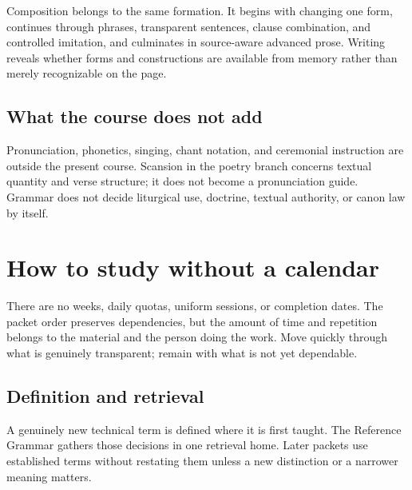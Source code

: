 Composition belongs to the same formation. It begins with changing one form,
continues through phrases, transparent sentences, clause combination, and
controlled imitation, and culminates in source-aware advanced prose. Writing
reveals whether forms and constructions are available from memory rather than
merely recognizable on the page.

\section{What the course does not add}

Pronunciation, phonetics, singing, chant notation, and ceremonial instruction
are outside the present course. Scansion in the poetry branch concerns textual
quantity and verse structure; it does not become a pronunciation guide.
Grammar does not decide liturgical use, doctrine, textual authority, or canon
law by itself.

\chapter{How to study without a calendar}

There are no weeks, daily quotas, uniform sessions, or completion dates. The
packet order preserves dependencies, but the amount of time and repetition
belongs to the material and the person doing the work. Move quickly through
what is genuinely transparent; remain with what is not yet dependable.

\section{Definition and retrieval}

A genuinely new technical term is defined where it is first taught. The
Reference Grammar gathers those decisions in one retrieval home. Later
packets use established terms without restating them unless a new distinction
or a narrower meaning matters.



